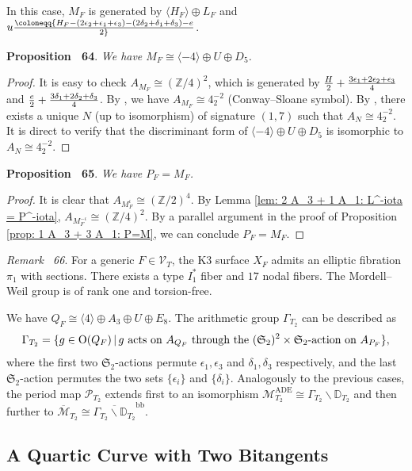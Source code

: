 \documentclass[
]{article}
\begin{document}
In this case, \(M_F\) is generated by \(\langle H_F\rangle\oplus L_F\)
and
\(u\coloneqq {H_F-(2\epsilon_2+\epsilon_1+\epsilon_3)-(2\delta_2+\delta_1+\delta_3)-e\over2}\).

\textbf{Proposition~ 64}. \emph{We have
\(M_F \cong \langle -4 \rangle\oplus U\oplus D_5\).}

\emph{Proof.} It is easy to check \(A_{M_F}\cong(\mathbb{Z}/4)^2\),
which is generated by
\({H\over2}+{3\epsilon_1+2\epsilon_2+\epsilon_3\over4}\) and
\({e\over2}+{3\delta_1+2\delta_2+\delta_3\over4}\). By
\cite[Chapter 15, \S 7.4]{conway1999sphere}, we have
\(A_{M_F}\cong 4^{-2}_{2}\) (Conway--Sloane symbol). By
\cite[Cor 1.13.3]{nikulin1979integer}, there exists a unique \(N\) (up
to isomorphism) of signature \((1,7)\) such that
\(A_N\cong 4^{-2}_{2}\). It is direct to verify that the discriminant
form of \(\langle -4 \rangle\oplus U\oplus D_5\) is isomorphic to
\(A_N\cong 4^{-2}_{2}\).~◻

\textbf{Proposition~ 65}. \emph{We have \(P_F=M_F\).}

\emph{Proof.} It is clear that \(A_{M_F^\iota}\cong(\mathbb{Z}/2)^4\).
By Lemma \ref{lem: 2 A_3 + 1 A_1: L^-iota = P^-iota},
\(A_{M_F^{-\iota}}\cong(\mathbb{Z}/4)^2\). By a parallel argument in the
proof of Proposition \ref{prop: 1 A_3 + 3 A_1: P=M}, we can conclude
\(P_F=M_F\).~◻

\emph{Remark~ 66}. For a generic \(F\in\mathcal{V}_T\), the K3 surface
\(X_F\) admits an elliptic fibration \(\pi_1\) with sections. There
exists a type \(I_1^*\) fiber and \(17\) nodal fibers. The Mordell--Weil
group is of rank one and torsion-free.

We have \(Q_F\cong \langle 4\rangle\oplus A_3\oplus U\oplus E_8\). The
arithmetic group \(\Gamma_{T_2}\) can be described as
\[\Gamma_{T_2} = \{ g\in\mathrm{O}(Q_F) \,|\, g \textup{ acts on } A_{Q_F} \textup{ through the } (\mathfrak{S}_2)^2\times\mathfrak{S}_2\textup{-action on } A_{P_F} \},\]
where the first two \(\mathfrak{S}_2\)-actions permute
\(\epsilon_1,\epsilon_3\) and \(\delta_1,\delta_3\) respectively, and
the last \(\mathfrak{S}_2\)-action permutes the two sets
\(\{\epsilon_i\}\) and \(\{\delta_i\}\). Analogously to the previous
cases, the period map \(\mathscr{P}_{T_2}\) extends first to an
isomorphism
\(\mathcal{M}_{T_2}^{\mathrm{ADE}} \cong \Gamma_{T_2} \backslash \mathbb{D}_{T_2}\)
and then further to
\(\overline{\mathcal{M}}_{T_2} \cong \overline{\Gamma_{T_2} \backslash \mathbb{D}_{T_2}}^{\mathrm{bb}}\).

\subsection{A Quartic Curve with Two
Bitangents}\label{a-quartic-curve-with-two-bitangents}
\end{document}
